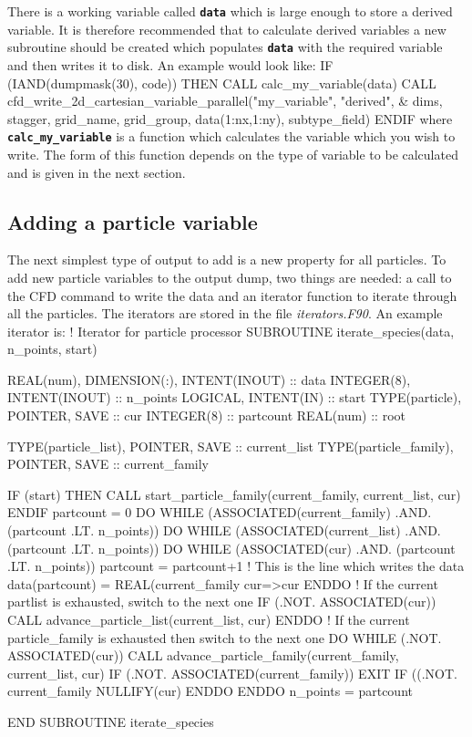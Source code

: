 \documentclass[12pt,a4paper]{article}
\newcommand{\inlinecode}[1]{{\color{warwickred} \bf\texttt{#1}}}
\newenvironment{boxverbatim}{\lboxverbatim{none}}{\endlboxverbatim}
\begin{document}
There is a working variable called \inlinecode{data} which is large enough to
store a derived variable. It is
therefore recommended that to calculate derived variables a new subroutine
should be created which populates \inlinecode{data} with the required variable
and then writes it to disk. An example would look like:
\begin{boxverbatim}
IF (IAND(dumpmask(30), code)) THEN
  CALL calc_my_variable(data)
  CALL cfd_write_2d_cartesian_variable_parallel("my_variable", "derived", &
      dims, stagger, grid_name, grid_group, data(1:nx,1:ny), subtype_field)
ENDIF
\end{boxverbatim}
where \inlinecode{calc\_my\_variable} is a function which calculates the
variable which you wish to write. The form of this function depends on the type
of variable to be calculated and is given in the next section.

\subsection{Adding a particle variable}
The next simplest type of output to add is a new property for all particles. To
add new particle variables to the output dump, two things are needed: a call
to the CFD command to write the data and an iterator function to iterate
through all the particles. The iterators are stored in the file
{\it iterators.F90}. An example iterator is:
\begin{boxverbatim}
! Iterator for particle processor
SUBROUTINE iterate_species(data, n_points, start)

  REAL(num), DIMENSION(:), INTENT(INOUT) :: data
  INTEGER(8), INTENT(INOUT) :: n_points
  LOGICAL, INTENT(IN) :: start
  TYPE(particle), POINTER, SAVE :: cur
  INTEGER(8) :: partcount
  REAL(num) :: root

  TYPE(particle_list), POINTER, SAVE :: current_list
  TYPE(particle_family), POINTER, SAVE :: current_family

  IF (start)  THEN
    CALL start_particle_family(current_family, current_list, cur)
  ENDIF
  partcount = 0
  DO WHILE (ASSOCIATED(current_family) .AND. (partcount .LT. n_points))
    DO WHILE (ASSOCIATED(current_list) .AND. (partcount .LT. n_points))
      DO WHILE (ASSOCIATED(cur) .AND. (partcount .LT. n_points))
        partcount = partcount+1
        ! This is the line which writes the data
        data(partcount) = REAL(current_family%
        cur=>cur%
      ENDDO
      ! If the current partlist is exhausted, switch to the next one
      IF (.NOT. ASSOCIATED(cur)) CALL advance_particle_list(current_list, cur)
    ENDDO
    ! If the current particle_family is exhausted then switch to the next one
    DO WHILE (.NOT. ASSOCIATED(cur))
      CALL advance_particle_family(current_family, current_list, cur)
      IF (.NOT. ASSOCIATED(current_family)) EXIT
      IF ((.NOT. current_family%
         NULLIFY(cur)
    ENDDO
  ENDDO
  n_points = partcount

END SUBROUTINE iterate_species
\end{boxverbatim}
\end{document}
